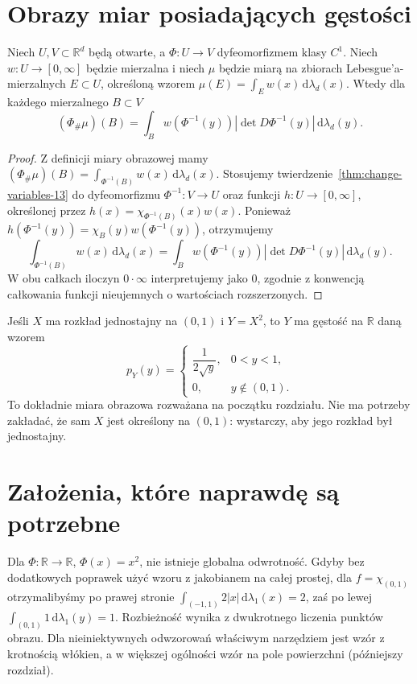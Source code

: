 \section{Obrazy miar posiadających gęstości}
\begin{twierdzenie}
\label{thm:density-transform-13}
Niech $U,V\subset\mathbb R^d$ będą otwarte,
a $\Phi:U\to V$ dyfeomorfizmem klasy $C^1$.
Niech $w:U\to[0,\infty]$ będzie mierzalna i
niech $\mu$ będzie miarą na zbiorach Lebesgue'a-mierzalnych
$E\subset U$, określoną wzorem
$\mu(E)=\int_Ew(x)\,\mathrm d\lambda_d(x)$.
Wtedy dla każdego mierzalnego $B\subset V$
\[
(\Phi_\#\mu)(B)=\int_B
w(\Phi^{-1}(y))|\det D\Phi^{-1}(y)|\,
\mathrm d\lambda_d(y).
\]
\end{twierdzenie}
\begin{proof}
Z definicji miary obrazowej mamy
$(\Phi_\#\mu)(B)=\int_{\Phi^{-1}(B)}w(x)\,
\mathrm d\lambda_d(x)$.
Stosujemy twierdzenie~\ref{thm:change-variables-13}
do dyfeomorfizmu $\Phi^{-1}:V\to U$ oraz funkcji
$h:U\to[0,\infty]$, określonej przez
$h(x)=\chi_{\Phi^{-1}(B)}(x)w(x)$.
Ponieważ
$h(\Phi^{-1}(y))=\chi_B(y)w(\Phi^{-1}(y))$,
otrzymujemy
\[
\int_{\Phi^{-1}(B)}w(x)\,\mathrm d\lambda_d(x)
=\int_B w(\Phi^{-1}(y))|\det D\Phi^{-1}(y)|
\,\mathrm d\lambda_d(y).
\]
W obu całkach iloczyn $0\cdot\infty$ interpretujemy
jako $0$, zgodnie z konwencją całkowania funkcji
nieujemnych o wartościach rozszerzonych.
\end{proof}

\begin{przyklad}
Jeśli $X$ ma rozkład jednostajny na $(0,1)$ i
$Y=X^2$, to $Y$ ma gęstość na $\mathbb R$ daną wzorem
\[
p_Y(y)=
\begin{cases}
\dfrac{1}{2\sqrt y},&0<y<1,\\
0,&y\notin(0,1).
\end{cases}
\]
To dokładnie miara obrazowa rozważana na początku rozdziału.
Nie ma potrzeby zakładać, że sam $X$ jest określony
na $(0,1)$: wystarczy, aby jego rozkład był jednostajny.
\end{przyklad}

\section{Założenia, które naprawdę są potrzebne}
\begin{przyklad}
Dla $\Phi:\mathbb R\to\mathbb R$, $\Phi(x)=x^2$,
nie istnieje globalna odwrotność. Gdyby bez dodatkowych
poprawek użyć wzoru z jakobianem na całej prostej, dla
$f=\chi_{(0,1)}$ otrzymalibyśmy po prawej stronie
$\int_{(-1,1)}2|x|\,\mathrm d\lambda_1(x)=2$,
zaś po lewej $\int_{(0,1)}1\,\mathrm d\lambda_1(y)=1$.
Rozbieżność wynika z dwukrotnego liczenia punktów obrazu.
Dla nieiniektywnych odwzorowań właściwym narzędziem
jest wzór z krotnością włókien, a w większej ogólności
wzór na pole powierzchni (późniejszy rozdział).
\end{przyklad}

